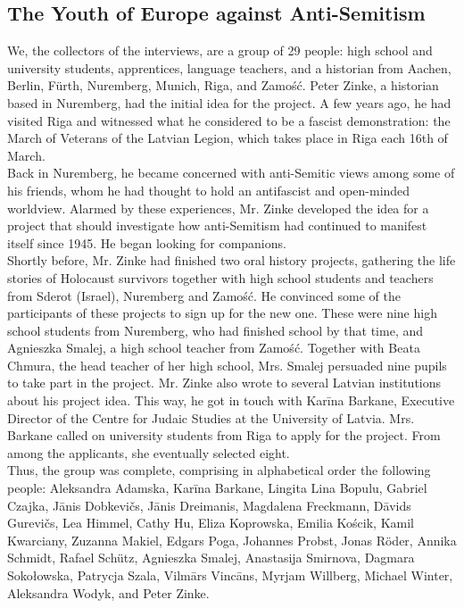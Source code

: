 \subsection*{The Youth of Europe against Anti-Semitism} 
\sloppy
We, the collectors of the interviews, are a group of 29 people: high school and university students, apprentices, language teachers, and a historian from Aachen, Berlin, Fürth, Nuremberg, Munich, Riga, and Zamość. Peter Zinke, a historian based in Nuremberg, had the initial idea for the project. A few years ago, he had visited Riga and witnessed what he considered to be a fascist demonstration: the March of Veterans of the Latvian Legion, which takes place in Riga each 16th of March.\\
Back in Nuremberg, he became concerned with anti-Semitic views among some of his friends, whom he had thought to hold an antifascist and open-minded worldview. Alarmed by these experiences, Mr. Zinke developed the idea for a project that should investigate how anti-Semitism had continued to manifest itself since 1945. He began looking for companions. \\
Shortly before, Mr. Zinke had finished two oral history projects, gathering the life stories of Holocaust survivors together with high school students and teachers from Sderot (Israel), Nuremberg and Zamość. He convinced some of the participants of these projects to sign up for the new one. These were nine high school students from Nuremberg, who had finished school by that time, and Agnieszka Smalej, a high school teacher from Zamość. Together with Beata Chmura, the head teacher of her high school, Mrs. Smalej persuaded nine pupils to take part in the project. Mr. Zinke also wrote to several Latvian institutions about his project idea. This way, he got in touch with Karīna Barkane, Executive Director of the Centre for Judaic Studies at the University of Latvia. Mrs. Barkane called on university students from Riga to apply for the project. From among the applicants, she eventually selected eight.\\
\sloppy
Thus, the group was complete, comprising in alphabetical order the following people: Aleksandra Adamska, Karīna Barkane, Lingita Lina Bopulu, Gabriel Czajka, Jānis Dobkevičs, Jānis Dreimanis, Magdalena Freckmann, Dāvids Gurevičs, Lea Himmel, Cathy Hu, Eliza Koprowska, Emilia Kościk, Kamil Kwarciany, Zuzanna Makiel, Edgars Poga, Johannes Probst, Jonas Röder, Annika Schmidt, Rafael Schütz, Agnieszka Smalej, Anastasija Smirnova, Dagmara Sokołowska, Patrycja Szala, Vilmārs Vincāns, Myrjam Willberg, Michael Winter, Aleksandra Wodyk, and Peter Zinke.\\
